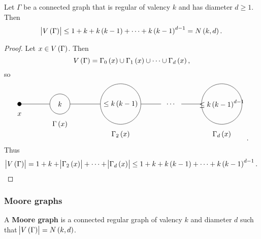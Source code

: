 \begin{proposition}
Let $ \Gamma $ be a connected graph that is regular of valency $ k $ and has diameter $ d \ge 1 $. Then
$$ \abs{V\br{\Gamma}} \le 1 + k + k\br{k - 1} + \dots + k\br{k - 1}^{d - 1} = N\br{k, d}. $$
\end{proposition}

\begin{proof}
Let $ x \in V\br{\Gamma} $. Then
$$ V\br{\Gamma} = \Gamma_0\br{x} \cup \Gamma_1\br{x} \cup \dots \cup \Gamma_d\br{x}, $$
so
$$
\begin{tikzpicture}
\fill (0, 0) circle (0.1);
\draw (0, -0.5) node{$ x $};
\draw (2, 0) circle (0.5) node{$ k $};
\draw (2, -1) node{$ \Gamma\br{x} $};
\draw (5, 0) circle (1) node{$ \le k\br{k - 1} $};
\draw (5, -1.5) node{$ \Gamma_2\br{x} $};
\draw (7.5, 0) node{$ \dots $};
\draw (10, 0) circle (1) node{$ \le k\br{k - 1}^{d - 1} $};
\draw (10, -1.5) node{$ \Gamma_d\br{x} $};
\draw (0, 0) to (1.5, 0);
\draw (2.5, 0) to (4, 0);
\draw (6, 0) to (7, 0);
\draw (8, 0) to (9, 0);
\end{tikzpicture}.
$$
Thus
$$ \abs{V\br{\Gamma}} = 1 + k + \abs{\Gamma_2\br{x}} + \dots + \abs{\Gamma_d\br{x}} \le 1 + k + k\br{k - 1} + \dots + k\br{k - 1}^{d - 1}. $$
\end{proof}

\subsubsection{Moore graphs}

\begin{definition*}
A \textbf{Moore graph} is a connected regular graph of valency $ k $ and diameter $ d $ such that $ \abs{V\br{\Gamma}} = N\br{k, d} $.
\end{definition*}

